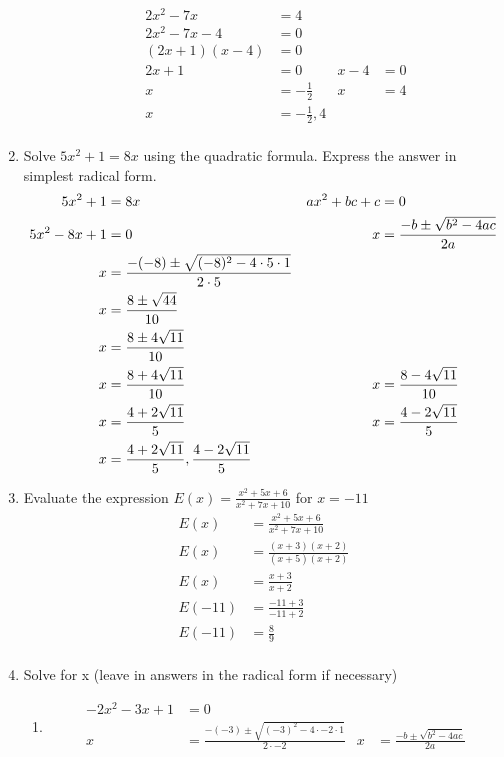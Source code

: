 \documentclass[paper=a4, fontsize=11pt]{scrartcl}
\begin{document}
\begin{enumerate}
\begin{enumerate}
\begin{align*}
            2x^2-7x&=4\\
            2x^2-7x-4&=0\\
            (2x+1)(x-4)&=0\\
            2x+1&=0&x-4&=0\\
            x&=-\frac{1}{2}&x&=4\\
            x&=-\frac{1}{2},4\\
        \end{align*}
    \end{enumerate}
    \item Solve $5x^2+1=8x$ using the quadratic formula. Express the answer in simplest radical form.
    \begin{align*}
        5x^2+1&=8x&ax^2+bc+c&=0\\
        5x^2-8x+1&=0&x&=\frac{-b\pm\sqrt{b^2-4ac}}{2a}\\\index{Quadratic Formula!$x=\frac{-b\pm\sqrt{b^2-4ac}}{2a}$}
        x&=\frac{-(-8)\pm\sqrt{(-8)^2-4\cdot 5\cdot 1}}{2\cdot 5}\\
        x&=\frac{8\pm\sqrt{44}}{10}\\
        x&=\frac{8\pm4\sqrt{11}}{10}\\
        x&=\frac{8+4\sqrt{11}}{10}&x&=\frac{8-4\sqrt{11}}{10}\\
        x&=\frac{4+2\sqrt{11}}{5}&x&=\frac{4-2\sqrt{11}}{5}\\
        x&=\frac{4+2\sqrt{11}}{5},\frac{4-2\sqrt{11}}{5}\\
    \end{align*}
    \item Evaluate the expression $E(x)=\frac{x^2+5x+6}{x^2+7x+10}$ for $x=-11$
    \begin{align*}
        E(x)&=\frac{x^2+5x+6}{x^2+7x+10}\\
        E(x)&=\frac{(x+3)(x+2)}{(x+5)(x+2)}\\
        E(x)&=\frac{x+3}{x+2}\\
        E(-11)&=\frac{-11+3}{-11+2}\\
        E(-11)&=\frac{8}{9}\\
    \end{align*}
    \item Solve for x (leave in answers in the radical form if necessary)
    \begin{enumerate}
        \item \begin{align*}
            -2x^2-3x+1&=0\\
            x&=\frac{-(-3)\pm\sqrt{(-3)^2-4\cdot -2\cdot 1}}{2\cdot -2}&x&=\frac{-b\pm\sqrt{b^2-4ac}}{2a}\\

\end{align*}
\end{enumerate}
\end{enumerate}
\end{document}
